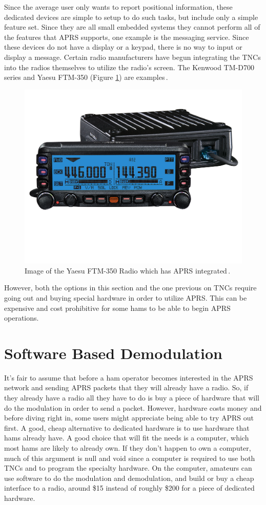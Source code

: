 Since the average user only wants to report positional information, these dedicated devices are simple to setup to do such tasks, but include only a simple feature set. Since they are all small embedded systems they cannot perform all of the features that APRS supports, one example is the messaging service. Since these devices do not have a display or a keypad, there is no way to input or display a message. Certain radio manufacturers have begun integrating the TNCs into the radios themselves to utilize the radio's screen. The Kenwood TM-D700 series and Yaesu FTM-350 (Figure \ref{yaesuFTM350}) are examples\,\cite{Kenwood,Yaesu}.

\begin{figure}
  \centering
	\includegraphics[width=0.75\linewidth]{images/FTM-350US_F.jpg} 
	\caption{Image of the Yaesu FTM-350 Radio which has APRS integrated\,\cite{Yaesua}.}
   \label{yaesuFTM350}
\end{figure}

However, both the options in this section and the one previous on TNCs require going out and buying special hardware in order to utilize APRS. This can be expensive and cost prohibitive for some hams to be able to begin APRS operations.

\section{Software Based Demodulation}
It's fair to assume that before a ham operator becomes interested in the APRS network and sending APRS packets that they will already have a radio. So, if they already have a radio all they have to do is buy a piece of hardware that will do the modulation in order to send a packet. However, hardware costs money and before diving right in, some users might appreciate being able to try APRS out first. A good, cheap alternative to dedicated hardware is to use hardware that hams already have. A good choice that will fit the needs is a computer, which most hams are likely to already own. If they don't happen to own a computer, much of this argument is null and void since a computer is required to use both TNCs and to program the specialty hardware. On the computer, amateurs can use software to do the modulation and demodulation, and build or buy a cheap interface to a radio, around \$15 instead of roughly \$200 for a piece of dedicated hardware.

